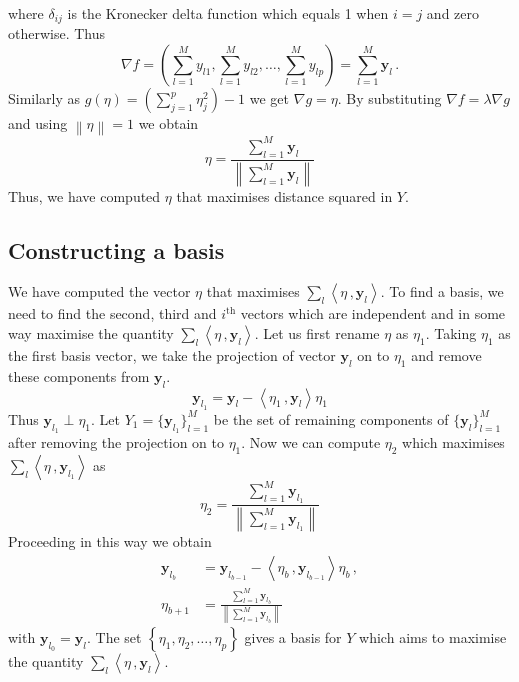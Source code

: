 \documentclass[11pt]{article}
\begin{document}
where $\delta_{ij}$ is the Kronecker delta function which equals 1 when $i=j$ and zero otherwise. Thus
\begin{equation}\label{eq:secMF8}
    \nabla f = \left(\sum_{l=1}^M y_{l1}, \sum_{l=1}^M y_{l2}, \ldots, \sum_{l=1}^M y_{lp}   \right) = \sum_{l=1}^M \bm{y}_l \, .
\end{equation}
Similarly as $g(\eta) = \left( \sum_{j=1}^p \eta_j^2\right) - 1$  we get $\nabla g = \eta$. By substituting  $\nabla f = \lambda \nabla g$ and using $\left\lVert \eta \right\rVert = 1 $ we obtain
\begin{equation}\label{eq:secMF9}
    \eta = \frac{\sum_{l=1}^M \bm{y}_l }{  \left\lVert\sum_{l=1}^M \bm{y}_l  \right\rVert  }
\end{equation}
Thus, we have computed $\eta$ that maximises distance squared in $Y$.  

\subsection{Constructing a basis}\label{sec:MathFrame3}
We have computed the vector $\eta$ that maximises $\sum_{l}\left\langle \eta\, ,  \bm{y}_{l} \right\rangle$. To find a basis,  we need to find the second, third and $i^{\text{th}}$ vectors which are independent and in some way maximise the quantity $\sum_{l}\left\langle \eta\, ,  \bm{y}_{l} \right\rangle$. Let us first rename $\eta$ as $\eta_1$. Taking $\eta_1$ as the first basis vector, we take the projection of vector $\bm{y}_l$ on to $\eta_1$  and remove these components from $\bm{y}_l$. 
\begin{equation}\label{eq:secMF10}
    \bm{y}_{l_1} = \bm{y}_l - \left\langle \eta_1 \, , \bm{y}_l \right \rangle \eta_1
\end{equation}
Thus $\bm{y}_{l_1} \perp \eta_1$. Let $Y_1 = \{\bm{y}_{l_1} \}_{l=1}^M $ be the set of remaining components of $\{ \bm{y}_l \}_{l=1}^M$ after removing the projection on to $\eta_1$. Now we can compute $\eta_2$ which maximises $\sum_{l}\left\langle \eta\, ,  \bm{y}_{l_1} \right\rangle$ as
\begin{equation}\label{eq:secMF11}
    \eta_2 = \frac{\sum_{l=1}^M \bm{y}_{l_1} }{  \left\lVert\sum_{l=1}^M \bm{y}_{l_1}  \right\rVert  } 
\end{equation}
Proceeding in this way we obtain 
\begin{align}
    \bm{y}_{l_{b}} & = \bm{y}_{l_{b-1}} - \left\langle \eta_b \, , \bm{y}_{l_{b-1}} \right \rangle \eta_b \, , \label{eq:secMF10} \\
     \eta_{b+1} & = \frac{\sum_{l=1}^M \bm{y}_{l_b} }{  \left\lVert\sum_{l=1}^M \bm{y}_{l_b}  \right\rVert  } \label{eq:secMF11}
\end{align}
with $\bm{y}_{l_0} = \bm{y}_{l}$. The set $\left\{ \eta_1, \eta_2, \ldots , \eta_p  \right\}$ gives a basis for $Y$ which aims to maximise the quantity $\sum_{l}\left\langle \eta\, ,  \bm{y}_{l} \right\rangle$.  \\
\end{document}

